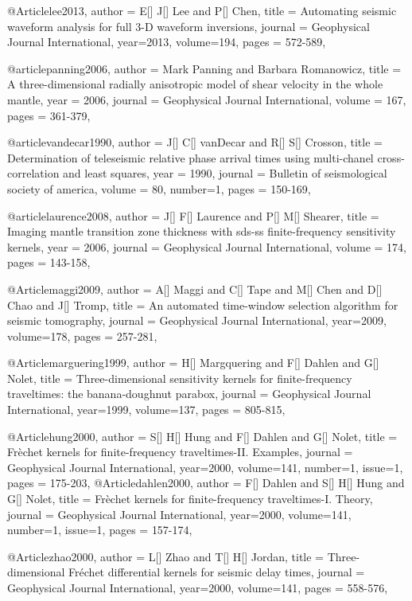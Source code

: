 @Article{lee2013,
  author =	 {E[] J[] Lee and P[] Chen},
  title =	 {Automating seismic waveform analysis for full 3-{D} waveform inversions},
  journal =	 {Geophysical Journal International},
  year=2013,
  volume=194,
  pages =	 {572-589},
}

@article{panning2006,
author = {Mark Panning and Barbara Romanowicz},
title = {A three-dimensional radially anisotropic model of shear velocity
in the whole mantle},
year = {2006},
journal = {Geophysical Journal International},
volume = {167},
pages = {361-379},
}

@article{vandecar1990,
author = {J[] C[] vanDecar and R[] S[] Crosson},
title = {Determination of teleseismic relative phase arrival times using multi-chanel cross-correlation and least squares},
year = {1990},
journal = {Bulletin of seismological society of america},
volume = {80},
number=1,
pages = {150-169},
}

@article{laurence2008,
author = {J[] F[] Laurence and P[] M[] Shearer},
title = {Imaging mantle transition zone thickness with sds-ss finite-frequency sensitivity kernels},
year = {2006},
journal = {Geophysical Journal International},
volume = {174},
pages = {143-158},
}



@Article{maggi2009,
  author =	 {A[] Maggi and C[] Tape and M[] Chen and D[] Chao and J[] Tromp},
  title =	 {An automated time-window selection algorithm for seismic tomography},
  journal =	 {Geophysical Journal International},
  year=2009,
  volume=178,
  pages =	 {257-281},
}

@Article{marguering1999,
  author =	 {H[] Margquering and F[] Dahlen and G[] Nolet},
  title =	 {Three-dimensional sensitivity kernels for finite-frequency traveltimes: the banana-doughnut parabox},
  journal =	 {Geophysical Journal International},
  year=1999,
  volume=137,
  pages =	 {805-815},
}

@Article{hung2000,
  author =	 {S[] H[] Hung and F[] Dahlen and G[] Nolet},
  title =	 {Fr\`{e}chet kernels for finite-frequency traveltimes-II. Examples},
  journal =	 {Geophysical Journal International},
  year=2000,
  volume=141,
  number=1,
  issue=1,
  pages =	 {175-203},
}
@Article{dahlen2000,
  author =	 { F[] Dahlen and S[] H[] Hung and G[] Nolet},
  title =	 {Fr\`{e}chet kernels for finite-frequency traveltimes-I. Theory},
  journal =	 {Geophysical Journal International},
  year=2000,
  volume=141,
  number=1,
  issue=1,
  pages =	 {157-174},
}

@Article{zhao2000,
  author =	 {L[] Zhao and T[] H[] Jordan},
  title =	 {Three-dimensional Fr\'{e}chet differential kernels for seismic delay times},
  journal =	 {Geophysical Journal International},
  year=2000,
  volume=141,
  pages =	 {558-576},
}

